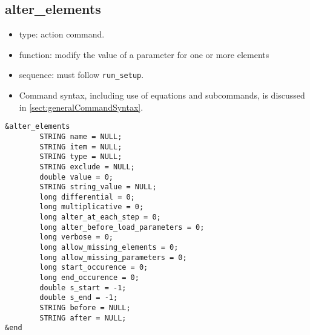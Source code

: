 \documentclass[11pt]{article}
\begin{document}
\subsection{alter\_elements\label{subsec:alterelements}}

\begin{itemize}
\item type: action command.
\item function: modify the value of a parameter for one or more elements
\item sequence: must follow \verb|run_setup|.
\item Command syntax, including use of equations and subcommands, is discussed in \ref{sect:generalCommandSyntax}.
\end{itemize}

\begin{verbatim}
&alter_elements
        STRING name = NULL;
        STRING item = NULL;
        STRING type = NULL;
        STRING exclude = NULL;
        double value = 0;
        STRING string_value = NULL;
        long differential = 0;
        long multiplicative = 0;
        long alter_at_each_step = 0;
        long alter_before_load_parameters = 0;
        long verbose = 0;
        long allow_missing_elements = 0;
        long allow_missing_parameters = 0;
        long start_occurence = 0;
        long end_occurence = 0;
        double s_start = -1;
        double s_end = -1;
        STRING before = NULL;
        STRING after = NULL;
&end
\end{verbatim}
\end{document}
